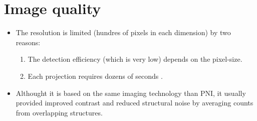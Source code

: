 \section{Image quality}
\begin{itemize}
\item The resolution is limited (hundres of pixels in each dimension)
  by two reasons:
  \begin{enumerate}
  \item The detection efficiency (which is very low) depends on the
    pixel-size.
  \item Each projection requires dozens of seconds
    \cite{abdulla2025SPECT}.
  \end{enumerate}
\item Althought it is based on the same imaging technology than PNI,
  it usually provided improved contrast and reduced structural noise
  by averaging counts from overlapping structures.
\end{itemize}